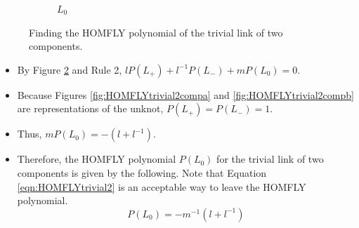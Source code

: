 \documentclass[titlepage]{article}
\numberwithin{figure}{section}
\numberwithin{table}{section}
\numberwithin{equation}{section}
\begin{document}
\begin{itemize}
\begin{figure}[h!]
        \begin{subfigure}[b]{0.2\linewidth}
            \centering
            \caption{$L_0$}
            \label{fig:HOMFLYtrivial2compc}
        \end{subfigure}
        \caption{Finding the HOMFLY polynomial of the trivial link of two components.}
        \label{fig:HOMFLYtrivial2comp}
    \end{figure}
    \begin{itemize}
        \item By Figure \ref{fig:HOMFLYtrivial2comp} and Rule 2, $lP(L_+)+l^{-1}P(L_-)+mP(L_0)=0$.
        \item Because Figures \ref{fig:HOMFLYtrivial2compa} and \ref{fig:HOMFLYtrivial2compb} are representations of the unknot, $P(L_+)=P(L_-)=1$.
        \item Thus, $mP(L_0)=-\left( l+l^{-1} \right)$.
        \item Therefore, the HOMFLY polynomial $P(L_0)$ for the trivial link of two components is given by the following. Note that Equation \ref{eqn:HOMFLYtrivial2} is an acceptable way to leave the HOMFLY polynomial.
        \begin{equation}\label{eqn:HOMFLYtrivial2}
            P(L_0)=-m^{-1}\left( l+l^{-1} \right)
        \end{equation}
    \end{itemize}
\end{itemize}
\end{document}
